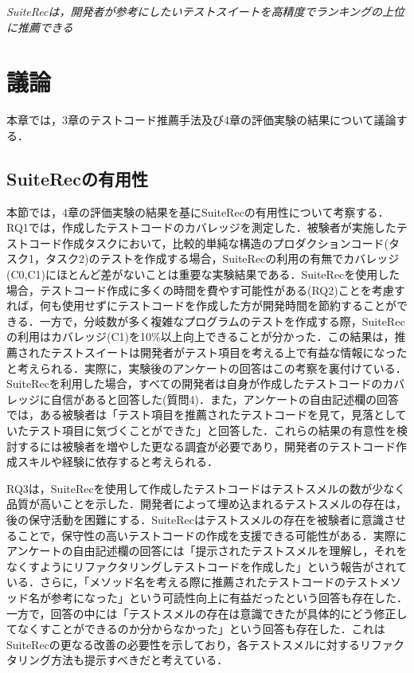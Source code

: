 \documentclass[12pt]{jarticle} %
\begin{document}
\vspace{\baselineskip}

\begin{breakbox}
\textit{{\sf SuiteRec}は，開発者が参考にしたいテストスイートを高精度でランキングの上位に推薦できる}
\end{breakbox}


\newpage
\section{議論}

本章では，3章のテストコード推薦手法及び4章の評価実験の結果について議論する．

\subsection{SuiteRecの有用性}
本節では，4章の評価実験の結果を基に{\sf SuiteRec}の有用性について考察する．RQ1では，作成したテストコードのカバレッジを測定した．被験者が実施したテストコード作成タスクにおいて，比較的単純な構造のプロダクションコード(タスク1，タスク2)のテストを作成する場合，{\sf SuiteRec}の利用の有無でカバレッジ(C0,C1)にほとんど差がないことは重要な実験結果である．{\sf SuiteRec}を使用した場合，テストコード作成に多くの時間を費やす可能性がある(RQ2)ことを考慮すれば，何も使用せずにテストコードを作成した方が開発時間を節約することができる．一方で，分岐数が多く複雑なプログラムのテストを作成する際，{\sf SuiteRec}の利用はカバレッジ(C1)を10\%以上向上できることが分かった．この結果は，推薦されたテストスイートは開発者がテスト項目を考える上で有益な情報になったと考えられる．実際に，実験後のアンケートの回答はこの考察を裏付けている．{\sf SuiteRec}を利用した場合，すべての開発者は自身が作成したテストコードのカバレッジに自信があると回答した(質問4)．また，アンケートの自由記述欄の回答では，ある被験者は「テスト項目を推薦されたテストコードを見て，見落としていたテスト項目に気づくことができた」と回答した．これらの結果の有意性を検討するには被験者を増やした更なる調査が必要であり，開発者のテストコード作成スキルや経験に依存すると考えられる．

RQ3は，{\sf SuiteRec}を使用して作成したテストコードはテストスメルの数が少なく品質が高いことを示した．開発者によって埋め込まれるテストスメルの存在は，後の保守活動を困難にする．{\sf SuiteRec}はテストスメルの存在を被験者に意識させることで，保守性の高いテストコードの作成を支援できる可能性がある．実際にアンケートの自由記述欄の回答には「提示されたテストスメルを理解し，それをなくすようにリファクタリングしテストコードを作成した」という報告がされている．さらに，「メソッド名を考える際に推薦されたテストコードのテストメソッド名が参考になった」という可読性向上に有益だったという回答も存在した．一方で，回答の中には「テストスメルの存在は意識できたが具体的にどう修正してなくすことができるのか分からなかった」という回答も存在した．これは{\sf SuiteRec}の更なる改善の必要性を示しており，各テストスメルに対するリファクタリング方法も提示すべきだと考えている．
\end{document}
